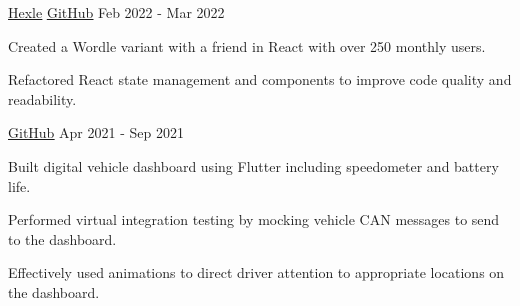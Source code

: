 

\begin{cventries}

  \cventry
    {\href{https://frankljin.github.io/hexle/}{\underline{Hexle}}} %
    {\href{https://github.com/frankljin/hexle/}{\underline{GitHub}} \faGithubSquare} %
    {} %
    {Feb 2022 - Mar 2022} %
    {
      \begin{cvitems} %
        \item {Created a Wordle variant with a friend in {React} with over 250 monthly users.}
        \item {Refactored React state management and components to improve code quality and readability.}
      \end{cvitems}
    }

  \cventry
    {\href{https://tinyurl.com/daniel-qu-portfolio}{\underline{}}} %
    {\href{https://github.com/uw-midsun/telemetry_xiv}{\underline{GitHub}} \faGithubSquare}
    {}
    {Apr 2021 - Sep 2021} %
    {
      \begin{cvitems} %
        \item {Built digital vehicle dashboard using {Flutter} including speedometer and battery life.}
        \item {Performed virtual {integration testing} by mocking vehicle CAN messages to send to the dashboard.}
        \item {Effectively used animations to direct driver attention to appropriate locations on the dashboard.}
      \end{cvitems}
    }



\end{cventries}
